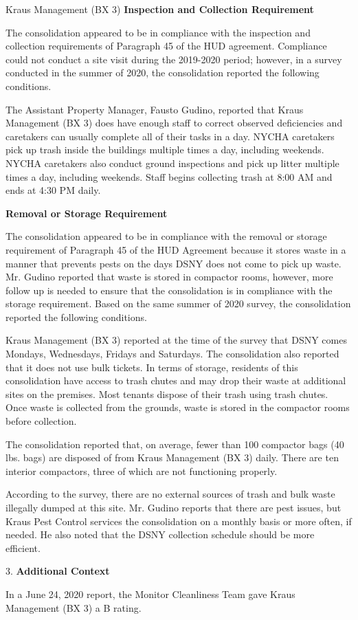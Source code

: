 Kraus Management (BX 3)
\textbf{Inspection and Collection Requirement}

The consolidation appeared to be in compliance with the inspection and collection requirements of Paragraph 45 of the HUD agreement. Compliance could not conduct a site visit during the 2019-2020 period; however, in a survey conducted in the summer of 2020, the consolidation reported the following conditions.

The Assistant Property Manager, Fausto Gudino, reported that Kraus Management (BX 3) does have enough staff to correct observed deficiencies and caretakers can usually complete all of their tasks in a day. NYCHA caretakers pick up trash inside the buildings multiple times a day, including weekends. NYCHA caretakers also conduct ground inspections and pick up litter multiple times a day, including weekends. Staff begins collecting trash at 8:00 AM and ends at 4:30 PM daily. 

\textbf{Removal or Storage Requirement}

The consolidation appeared to be in compliance with the  removal or storage requirement of Paragraph  45 of the HUD Agreement because it stores waste in a manner that prevents pests on the days DSNY does not come to pick up waste. Mr. Gudino reported that waste is stored in compactor rooms, however, more follow up is needed to ensure that the consolidation is in compliance with the storage requirement. Based on the same summer of  2020 survey, the consolidation reported the following conditions.

Kraus Management (BX 3) reported at the time of the survey that DSNY comes Mondays, Wednesdays, Fridays and Saturdays. The consolidation also reported that it does not use bulk tickets. In terms of storage, residents of this consolidation have access to trash chutes and may drop their waste at additional sites on the premises. Most tenants dispose of their trash using trash chutes. Once waste is collected from the grounds, waste is stored in the compactor rooms before collection. 

The consolidation reported that, on average, fewer than 100 compactor bags (40 lbs. bags) are disposed of from Kraus Management (BX 3) daily. There are ten interior compactors, three of which are not functioning properly. 

According to the survey, there are no external sources of trash and bulk waste illegally dumped at this site. Mr. Gudino reports that there are pest issues, but Kraus Pest Control services the consolidation on a monthly basis or more often, if needed. He also noted that the DSNY collection schedule should be more efficient. 

3. \textbf{Additional Context} 

In a June 24, 2020 report, the Monitor Cleanliness Team gave Kraus Management (BX 3) a B rating. 